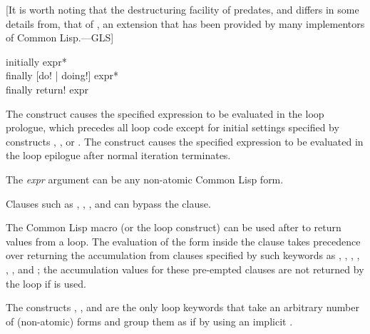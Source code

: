 [It is worth noting that the destructuring facility of  predates,
and differs in some details from, that
of , an extension that has been provided by many implementors
of Common Lisp.---GLS]

\begin{defloop}
initially {expr}* \\
finally [\!do! | \!doing!] {expr}* \\
finally \!return! expr

The  construct causes the specified expression to be evaluated
in the loop prologue, which precedes all loop code except for 
initial settings specified by constructs , , or
.
The  construct causes the specified expression to be evaluated
in the loop epilogue after normal iteration terminates.

The \emph{expr\/} argument can be any non-atomic Common Lisp form.

Clauses such as , , , and 
can bypass the  clause.

The Common Lisp macro  (or the  loop construct) can be used
after  to return
values from a loop.  The evaluation of the  form inside the
 clause takes precedence over returning the accumulation
from clauses specified by such keywords as , , 
, , , , and ; 
the accumulation values for these pre-empted clauses are not returned by 
the loop if  is used.

The constructs , , and  are the
only loop keywords that take an arbitrary number of (non-atomic) forms and group
them as if by using an implicit .  

\goodbreak


\end{defloop}
